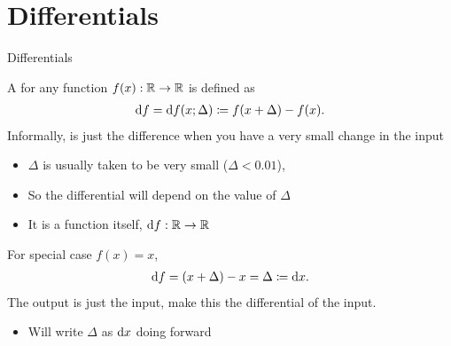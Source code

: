 \documentclass[8pt, aspectratio=149]{beamer}
\begin{document}
\section{Differentials} 
\begin{frame}{Differentials}

    A  for any function \( f(x) : \mathbb{R} \to \mathbb{R} \) is defined as 
    \begin{align*}
        \mathrm{d} f 
        = \mathrm{d} f(x; \Delta) 
        \coloneqq f(x + \Delta) - f(x). 
    \end{align*} 
    Informally, is just the difference when you have a very small change in the input 
    \begin{itemize}
        \item \( \Delta \) is usually taken to be very small (\( \Delta < 0.01 \)),  
        \item So the differential will depend on the value of \( \Delta \) 
        \item It is a function itself, \( \mathrm{d} f : \mathbb{R} \to \mathbb{R} \)  
    \end{itemize}

    \vspace{1em}
    For special case \( f(x) = x \), 
    \begin{align*}
        \mathrm{d} f = (x + \Delta) - x = \Delta \coloneqq \mathrm{d} x. 
    \end{align*}
    The output is just the input, make this the differential of the input. 
    \begin{itemize}
        \item Will write \( \Delta \) as \( \mathrm{d} x \) doing forward 
    \end{itemize}

\end{frame}
\end{document}
